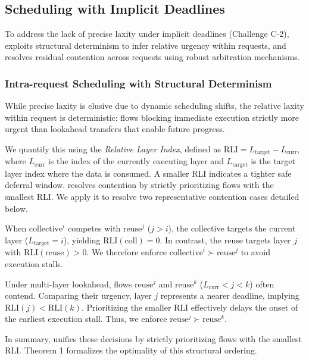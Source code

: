 \subsection{Scheduling with Implicit Deadlines} \label{design:implicit}

To address the lack of precise laxity under implicit deadlines (Challenge C-2), \sys exploits structural determinism to infer relative urgency within requests, and resolves residual contention across requests using robust arbitration mechanisms.

\subsubsection{Intra-request Scheduling with Structural Determinism}\label{design:intrareq}

While precise laxity is elusive due to dynamic scheduling shifts, the relative laxity within request is deterministic: flows blocking immediate execution strictly more urgent than lookahead transfers that enable future progress.

We quantify this using the \emph{Relative Layer Index}, defined as $\text{RLI} = L_{\text{target}} - L_{\text{curr}}$, where $L_{\text{curr}}$ is the index of the currently executing layer and $L_{\text{target}}$ is the target layer index where the data is consumed. A smaller RLI indicates a tighter safe deferral window. \sys{} resolves contention by strictly prioritizing flows with the smallest RLI. We apply it to resolve two representative contention cases detailed below.

 When $\text{collective}^{i}$ competes with $\text{reuse}^{j}$ ($j > i$), the collective targets the current layer ($L_{\text{target}} = i$), yielding $\text{RLI}(\text{coll}) = 0$. In contrast, the reuse targets layer $j$ with $\text{RLI}(\text{reuse}) > 0$. We therefore enforce $\text{collective}^{i} \succ \text{reuse}^{j}$ to avoid execution stalls.

 Under multi-layer lookahead, flows $\text{reuse}^{j}$ and $\text{reuse}^{k}$ ($L_{\text{curr}} < j < k$) often contend. Comparing their urgency, layer $j$ represents a nearer deadline, implying $\text{RLI}(j) < \text{RLI}(k)$. Prioritizing the smaller RLI effectively delays the onset of the earliest execution stall. Thus, we enforce $\text{reuse}^{j} \succ \text{reuse}^{k}$.

In summary, \sys{} unifies these decisions by strictly prioritizing flows with the smallest RLI. Theorem 1 formalizes the optimality of this structural ordering.

